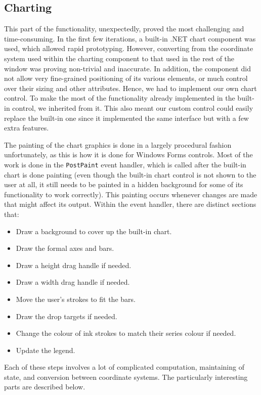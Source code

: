 	
	
	
	

	
	\subsection{Charting}
	This part of the functionality, unexpectedly, proved the most challenging and time-consuming. In the first few iterations, a built-in .NET chart component was used, which allowed rapid prototyping. However, converting from the coordinate system used within the charting component to that used in the rest of the window was proving non-trivial and inaccurate. In addition, the component did not allow very fine-grained positioning of its various elements, or much control over their sizing and other attributes. Hence, we had to implement our own chart control. To make the most of the functionality already implemented in the built-in control, we inherited from it. This also meant our custom control could easily replace the built-in one since it implemented the same interface but with a few extra features.
	
	The painting of the chart graphics is done in a largely procedural fashion unfortunately, as this is how it is done for Windows Forms controls. Most of the work is done in the \texttt{PostPaint} event handler, which is called after the built-in chart is done painting (even though the built-in chart control is not shown to the user at all, it still needs to be painted in a hidden background for some of its functionality to work correctly). This painting occurs whenever changes are made that might affect its output. Within the event handler, there are distinct sections that:
	\begin{itemize}
	\item Draw a background to cover up the built-in chart.
	\item Draw the formal axes and bars.
	\item Draw a height drag handle if needed.
	\item Draw a width drag handle if needed.
	\item Move the user's strokes to fit the bars.
	\item Draw the drop targets if needed.
	\item Change the colour of ink strokes to match their series colour if needed. 
	\item Update the legend.
	\end{itemize}
	
	Each of these steps involves a lot of complicated computation, maintaining of state, and conversion between coordinate systems. The particularly interesting parts are described below.
	
